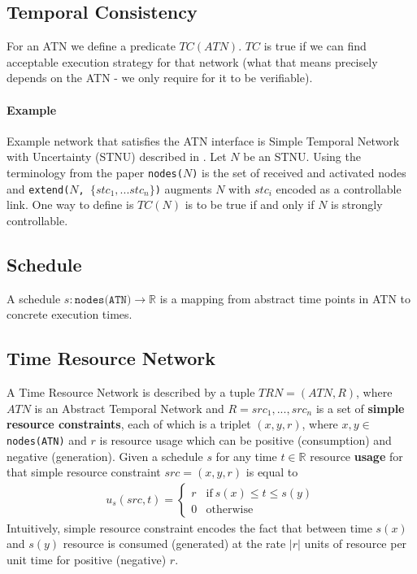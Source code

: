 \documentclass{article}
\begin{document}
\begin{multicols}{2}
\subsection{Temporal Consistency}
\label{temporal_consistency}
For an ATN we define a predicate $TC(ATN)$. $TC$ is true if we can find acceptable execution strategy for that network (what that means precisely depends on the ATN - we only require for it to be verifiable).
\paragraph{Example}
Example network that satisfies the ATN interface is Simple Temporal Network with Uncertainty (STNU) described in \cite{vidal1996dealing}. Let $N$ be an STNU. Using the terminology from the paper \texttt{nodes($N$)} is the set of received and activated nodes and \texttt{extend($N$, $\{ stc_1, ... stc_n \} $)} augments $N$ with $stc_i$ encoded as a controllable link. One way to define is $TC(N)$ is to be true if and only if $N$ is strongly controllable.
\subsection{Schedule}
A schedule $s: \texttt{nodes(ATN)} \rightarrow \mathbb{R}$ is a mapping from abstract time points in ATN to concrete execution times.
\subsection{Time Resource Network}
A Time Resource Network is described by a tuple $TRN = (ATN, R)$, where $ATN$ is an Abstract Temporal Network and $R={src_1, ..., src_n}$ is a set of \textbf{simple resource constraints}, each of which is a triplet $(x, y, r)$, where $x, y \in$ \texttt{nodes(ATN)} and $r$ is resource usage which can be positive (consumption) and negative (generation). Given a schedule $s$ for any time $t \in \mathbb{R}$ resource \textbf{usage} for that simple resource constraint $src=(x,y,r)$ is equal to
\begin{align*}
u_s(src, t) = \begin{cases}
r & \text{if}\ s(x) \leq t \leq s(y)\\
0 & \text{otherwise}
\end{cases}
\end{align*}
Intuitively, simple resource constraint encodes the fact that between time $s(x)$ and $s(y)$  resource is consumed (generated) at the rate $|r|$ units of resource per unit time for positive (negative) $r$.


\end{multicols}
\end{document}
